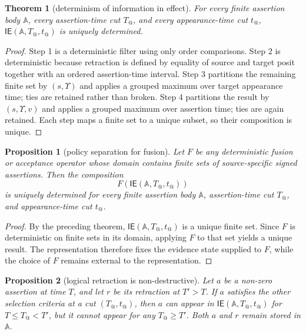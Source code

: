 \documentclass[a4paper,fleqn]{cas-sc}
\newcommand{\ie}{\mathsf{IE}}
\theoremstyle{plain}
\newtheorem{theorem}{Theorem}
\newtheorem{proposition}{Proposition}
\theoremstyle{remark}
\begin{document}
\begin{theorem}[determinism of information in effect]
For every finite assertion body \(\mathbb{A}\), every assertion-time cut \(T_@\), and every appearance-time cut \(t_@\), \(\ie(\mathbb{A},T_@,t_@)\) is uniquely determined.
\end{theorem}

\begin{proof}
Step 1 is a deterministic filter using only order comparisons. Step 2 is deterministic because retraction is defined by equality of source and target posit together with an ordered assertion-time interval. Step 3 partitions the remaining finite set by \((s,\Upsilon)\) and applies a grouped maximum over target appearance time; ties are retained rather than broken. Step 4 partitions the result by \((s,\Upsilon,v)\) and applies a grouped maximum over assertion time; ties are again retained. Each step maps a finite set to a unique subset, so their composition is unique.
\end{proof}

\begin{proposition}[policy separation for fusion]
\label{Prop:policy-separation}
Let \(F\) be any deterministic fusion or acceptance operator whose domain contains finite sets of source-specific signed assertions. Then the composition
\[
F(\ie(\mathbb{A},T_@,t_@))
\]
is uniquely determined for every finite assertion body \(\mathbb{A}\), assertion-time cut \(T_@\), and appearance-time cut \(t_@\).
\end{proposition}

\begin{proof}
By the preceding theorem, \(\ie(\mathbb{A},T_@,t_@)\) is a unique finite set. Since \(F\) is deterministic on finite sets in its domain, applying \(F\) to that set yields a unique result. The representation therefore fixes the evidence state supplied to \(F\), while the choice of \(F\) remains external to the representation.
\end{proof}

\begin{proposition}[logical retraction is non-destructive]
Let \(a\) be a non-zero assertion at time \(T\), and let \(r\) be its retraction at \(T'>T\). If \(a\) satisfies the other selection criteria at a cut \((T_@,t_@)\), then \(a\) can appear in \(\ie(\mathbb{A},T_@,t_@)\) for \(T\leq T_@<T'\), but it cannot appear for any \(T_@\geq T'\). Both \(a\) and \(r\) remain stored in \(\mathbb{A}\).
\end{proposition}
\end{document}
